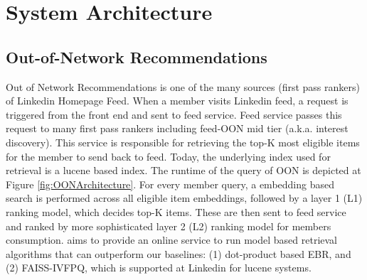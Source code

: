 \section{System Architecture}\label{sec:system_deployment}

\subsection{Out-of-Network Recommendations}




Out of Network Recommendations is one of the many sources (first pass rankers) of Linkedin Homepage Feed. When a member visits Linkedin feed, a request is triggered from the front end and sent to feed service. Feed service passes this request to many first pass rankers including feed-OON mid tier (a.k.a. interest discovery). This service is responsible for retrieving the top-K most eligible items for the member to send back to feed. Today, the underlying index used for retrieval is a lucene based index. 
The runtime of the query of OON is depicted at Figure \ref{fig:OONArchitecture}. For every member query, a embedding based search is performed across all eligible item embeddings, followed by a layer 1 (L1) ranking model, which decides top-K items. 
These are then sent to feed service and ranked by more sophisticated layer 2 (L2) ranking model for members consumption.
{\systemname} aims to provide an online service to run model based retrieval algorithms that can outperform our baselines: (1) dot-product based EBR, and (2) FAISS-IVFPQ, which is supported at Linkedin for lucene systems. 

